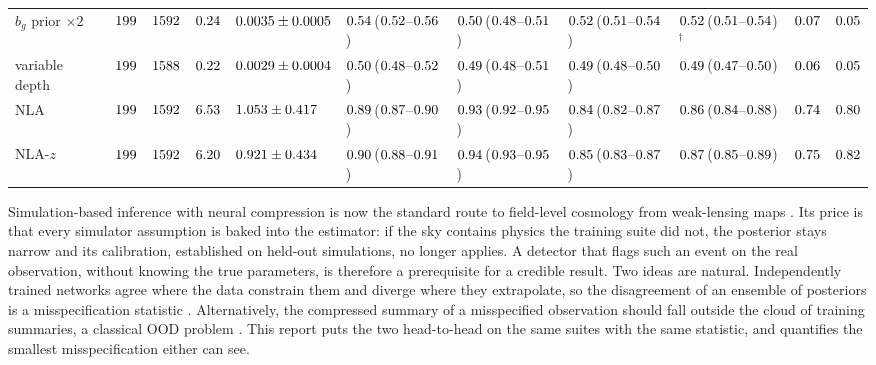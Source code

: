 \documentclass[9pt,twocolumn]{extarticle}
\newcommand{\bg}{b_g}
\newcommand{\ci}[3]{#1\,{\scriptsize(#2--#3)}}
\begin{document}
\begin{table}[tb]
\begin{tabular}{lrrrlllllrr}
$\bg$ prior $\times2$ & $199$ & $1592$ & $0.24$ & $0.0035\pm0.0005$ & \ci{$0.54$}{$0.52$}{$0.56$} & \ci{$0.50$}{$0.48$}{$0.51$} & \ci{$0.52$}{$0.51$}{$0.54$} & \ci{$0.52$}{$0.51$}{$0.54$}$^\dagger$ & $0.07$ & $0.05$\\
variable depth & $199$ & $1588$ & $0.22$ & $0.0029\pm0.0004$ & \ci{$0.50$}{$0.48$}{$0.52$} & \ci{$0.49$}{$0.48$}{$0.51$} & \ci{$0.49$}{$0.48$}{$0.50$} & \ci{$0.49$}{$0.47$}{$0.50$} & $0.06$ & $0.05$\\
NLA & $199$ & $1592$ & $6.53$ & $1.053\pm0.417$ & \ci{$0.89$}{$0.87$}{$0.90$} & \ci{$0.93$}{$0.92$}{$0.95$} & \ci{$0.84$}{$0.82$}{$0.87$} & \ci{$0.86$}{$0.84$}{$0.88$} & $0.74$ & $0.80$\\
NLA-$z$ & $199$ & $1592$ & $6.20$ & $0.921\pm0.434$ & \ci{$0.90$}{$0.88$}{$0.91$} & \ci{$0.94$}{$0.93$}{$0.95$} & \ci{$0.85$}{$0.83$}{$0.87$} & \ci{$0.87$}{$0.85$}{$0.89$} & $0.75$ & $0.82$\\
\bottomrule
\end{tabular}
\end{table}
Simulation-based inference with neural compression \cite{jeffrey2021,papamakarios2016} is now the
standard route to field-level cosmology from weak-lensing maps \cite{jeffrey2025}. Its price is that
every simulator assumption is baked into the estimator: if the sky contains physics the training suite
did not, the posterior stays narrow and its calibration, established on held-out simulations, no
longer applies. A detector that flags such an event on the real observation, without knowing the true
parameters, is therefore a prerequisite for a credible result. Two ideas are natural. Independently
trained networks agree where the data constrain them and diverge where they extrapolate, so the
disagreement of an ensemble of posteriors is a misspecification statistic \cite{lakshminarayanan2017}.
Alternatively, the compressed summary of a misspecified observation should fall outside the cloud of
training summaries, a classical OOD problem \cite{sun2022,morningstar2021}. This report puts the two
head-to-head on the same suites with the same statistic, and quantifies the smallest misspecification
either can see.
\end{document}
